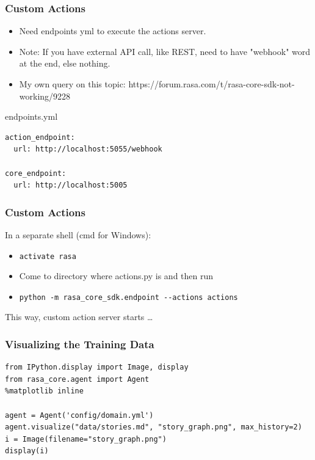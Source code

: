  \begin{frame}[fragile]\frametitle{Custom Actions}

\begin{itemize}
\item Need endpoints yml to execute the actions server.
\item Note: If you have external API call, like REST, need to have "webhook" word at the end, else nothing.
\item My own query on this topic: https://forum.rasa.com/t/rasa-core-sdk-not-working/9228
\end{itemize}

endpoints.yml
\begin{lstlisting}
action_endpoint:
  url: http://localhost:5055/webhook

core_endpoint:
  url: http://localhost:5005
\end{lstlisting}
\end{frame}

 \begin{frame}[fragile]\frametitle{Custom Actions}

 In a separate shell (cmd for Windows):
 
\begin{itemize}
\item \lstinline|activate rasa|
\item Come to directory where actions.py is and then run
\item \lstinline|python -m rasa_core_sdk.endpoint --actions actions|
\end{itemize}

This way, custom action server starts \ldots
\end{frame}

 \begin{frame}[fragile]\frametitle{Visualizing the Training Data}


\begin{lstlisting}
from IPython.display import Image, display
from rasa_core.agent import Agent
%matplotlib inline

agent = Agent('config/domain.yml')
agent.visualize("data/stories.md", "story_graph.png", max_history=2)
i = Image(filename="story_graph.png")
display(i)
\end{lstlisting}

\end{frame}

